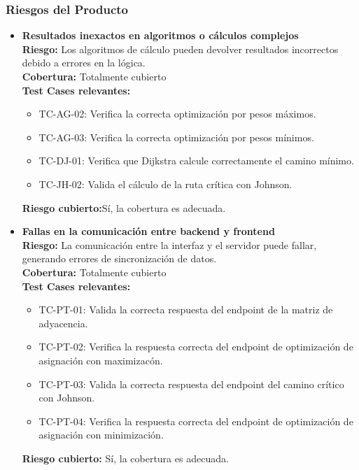 \documentclass[stu, 12pt, letterpaper, donotrepeattitle, floatsintext, natbib]{apa7}
\begin{document}
\subsubsection{Riesgos del Producto}

\begin{itemize}
    \item \textbf{Resultados inexactos en algoritmos o cálculos complejos} \\ 
    \textbf{Riesgo:} Los algoritmos de cálculo pueden devolver resultados incorrectos debido a errores en la lógica. \\ 
    \textbf{Cobertura:} Totalmente cubierto \\ 
    \textbf{Test Cases relevantes:} 
    \begin{itemize}
      \item TC-AG-02: Verifica la correcta optimización por pesos máximos.
      \item TC-AG-03: Verifica la correcta optimización por pesos mínimos.
      \item TC-DJ-01: Verifica que Dijkstra calcule correctamente el camino mínimo.
      \item TC-JH-02: Valida el cálculo de la ruta crítica con Johnson.
    \end{itemize}
    \textbf{Riesgo cubierto:}Sí, la cobertura es adecuada.
  
    \item \textbf{Fallas en la comunicación entre backend y frontend} \\ 
    \textbf{Riesgo:} La comunicación entre la interfaz y el servidor puede fallar, generando errores de sincronización de datos. \\ 
    \textbf{Cobertura:} Totalmente cubierto \\ 
    \textbf{Test Cases relevantes:} 
    \begin{itemize}
      \item TC-PT-01: Valida la correcta respuesta del endpoint de la matriz de adyacencia.
      \item TC-PT-02: Verifica la respuesta correcta del endpoint de optimización de asignación con maximizacón.
      \item TC-PT-03: Valida la correcta respuesta del endpoint del camino crítico con Johnson.
      \item TC-PT-04: Verifica la respuesta correcta del endpoint de optimización de asignación con minimización.
    \end{itemize}
    \textbf{Riesgo cubierto:} Sí, la cobertura es adecuada.
  

\end{itemize}
\end{document}
